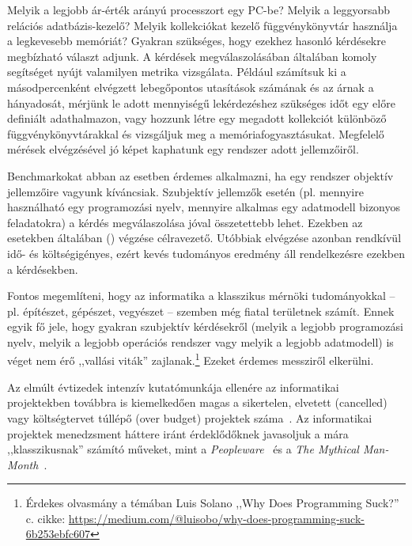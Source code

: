 \label{cha:benchmarking}

\graphicspath{ {./benchmarking/figures/} }

Melyik a legjobb ár-érték arányú processzort egy PC-be? Melyik a leggyorsabb relációs adatbázis-kezelő? Melyik kollekciókat kezelő függvénykönyvtár használja a legkevesebb memóriát? Gyakran szükséges, hogy ezekhez hasonló kérdésekre megbízható választ adjunk. A kérdések megválaszolásában általában komoly segítséget nyújt valamilyen metrika vizsgálata. Például számítsuk ki a másodpercenként elvégzett lebegőpontos utasítások számának és az árnak a hányadosát, mérjünk le adott mennyiségű lekérdezéshez szükséges időt egy előre definiált adathalmazon, vagy hozzunk létre egy megadott kollekciót különböző függvénykönyvtárakkal és vizsgáljuk meg a memóriafogyasztásukat. Megfelelő mérések elvégzésével jó képet kaphatunk egy rendszer adott jellemzőiről.

\begin{megjegyzes}
	Benchmarkokat abban az esetben érdemes alkalmazni, ha egy rendszer objektív jellemzőire vagyunk kíváncsiak. Szubjektív jellemzők esetén (pl. mennyire használható egy programozási nyelv, mennyire alkalmas egy adatmodell bizonyos feladatokra) a kérdés megválaszolása jóval összetettebb lehet. Ezekben az esetekben általában  () végzése célravezető. Utóbbiak elvégzése azonban rendkívül idő- és költségigényes, ezért kevés tudományos eredmény áll rendelkezésre ezekben a kérdésekben.
	
	Fontos megemlíteni, hogy az informatika a klasszikus mérnöki tudományokkal -- pl. építészet, gépészet, vegyészet -- szemben még fiatal területnek számít. Ennek egyik fő jele, hogy gyakran szubjektív kérdésekről (melyik a legjobb programozási nyelv, melyik a legjobb operációs rendszer vagy melyik a legjobb adatmodell) is véget nem érő ,,vallási viták'' zajlanak.\footnote{Érdekes olvasmány a témában Luis Solano ,,Why Does Programming Suck?'' c. cikke: \url{https://medium.com/@luisobo/why-does-programming-suck-6b253ebfc607}} Ezeket érdemes messziről elkerülni.
	
	Az elmúlt évtizedek intenzív kutatómunkája ellenére az informatikai projektekben továbbra is kiemelkedően magas a sikertelen, elvetett (cancelled) vagy költségtervet túllépő (over budget) projektek száma~\cite{HBR:ITProjects}. Az informatikai projektek menedzsment háttere iránt érdeklődőknek javasoljuk a mára ,,klasszikusnak'' számító műveket, mint a \emph{Peopleware}~\cite{demarco2013peopleware} és a \emph{The Mythical Man-Month}~\cite{brooks1995mythical}.
	
\end{megjegyzes}

